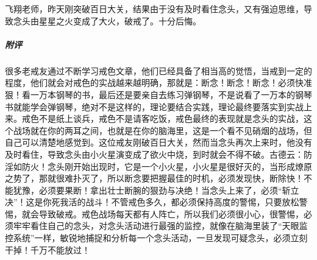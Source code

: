 \begin{case}
    飞翔老师，昨天刚突破百日大关，结果由于没有及时看住念头，又有强迫思维，导致念头由星星之火变成了大火，破戒了。十分后悔。
    \subparagraph{附评} 很多老戒友通过不断学习戒色文章，他们已经具备了相当高的觉悟，当戒到一定的程度，他们就会对戒色的实战越来越明确，那就是：断念！断念！断念！必须快准狠！看一万本钢琴的书，最后还是要亲自去练习弹钢琴，不是说看了一万本的钢琴书就能学会弹钢琴，绝对不是这样的，理论要结合实践，理论最终要落实到实战上来。戒色不是纸上谈兵，戒色不是请客吃饭，戒色最终的表现就是念头的实战，这个战场就在你的两耳之间，也就是在你的脑海里，这是一个看不见硝烟的战场，但自己可以清楚地感觉到。这位戒友刚破百日大关，然而当念头再次上来时，他没有及时看住，导致念头由小火星演变成了欲火中烧，到时就会不得不破。古德云：防淫如防火！念头刚开始出现时，它是一个小火星，小火星是很好灭的，当形成燎原之势了，那就很难扑灭了，所以断念要把握最佳的时机，必须发现快，断除快！不能犹豫，必须要果断！拿出壮士断腕的狠劲与决绝！当念头上来了，必须“斩立决”！这是你死我活的战斗！不管戒色多久，都必须保持高度的警惕，只要放松警惕，就会导致破戒。戒色战场每天都有人阵亡，所以我们必须很小心，很警惕，必须牢牢看住自己的念头，对念头活动进行最强的监控，就像在脑海里装了“天眼监控系统”一样，敏锐地捕捉和分析每一个念头活动，一旦发现可疑念头，必须立刻干掉！千万不能放过！
\end{case}

